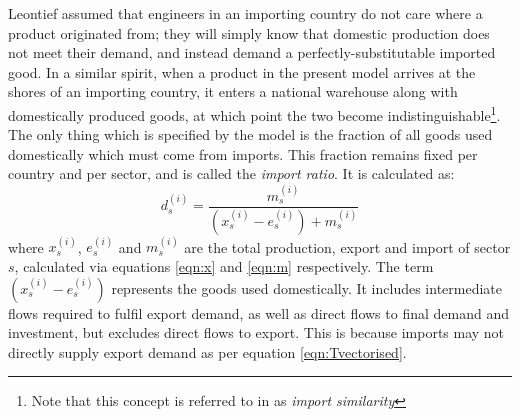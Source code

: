 \documentclass[a4paper]{article}
\begin{document}
Leontief assumed that engineers in an importing country do not care where a product originated from; they will simply know that domestic production does not meet their demand, and instead demand a perfectly-substitutable imported good.
In a similar spirit, when a product in the present model arrives at the shores of an importing country, it enters a national warehouse along with domestically produced goods, at which point the two become indistinguishable\footnote{Note that this concept is referred to in \textcite{Miller1985} as \textit{import similarity}}.
The only thing which is specified by the model is the fraction of all goods used domestically which must come from imports. This fraction remains fixed per country and per sector, and is called the \textit{import ratio}. It is calculated as:
\begin{equation}\label{eqn:importratio}
d_s^{(i)} = \frac{m_s^{(i)}}{(x_s^{(i)} - e_s^{(i)} ) + m_s^{(i)}}
\end{equation}
where $x_s^{(i)}$, $e_s^{(i)}$ and $m_s^{(i)}$ are the total production, export and import of sector $s$, calculated via equations \eqref{eqn:x} and \eqref{eqn:m} respectively.
The term $(x_s^{(i)} - e_s^{(i)} )$ represents the goods used domestically.
It includes intermediate flows required to fulfil export demand, as well as direct flows to final demand and investment, but excludes direct flows to export.
This is because imports may not directly supply export demand as per equation \eqref{eqn:Tvectorised}.
\end{document}
